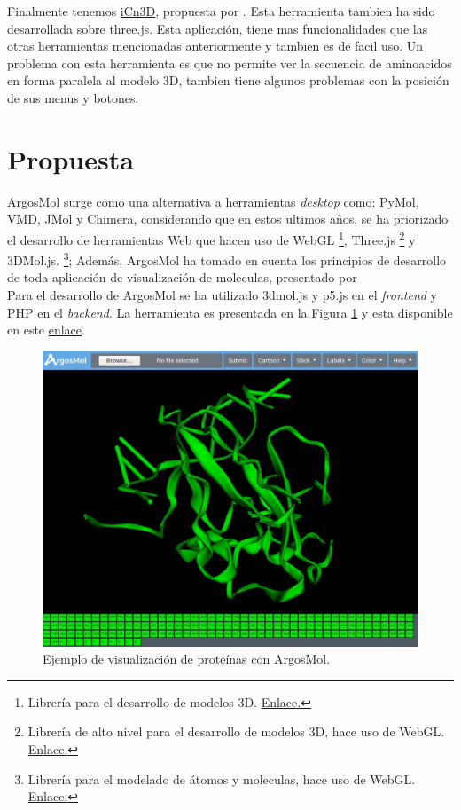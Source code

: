 \documentclass{article}
\begin{document}
Finalmente tenemos \href{https://www.ncbi.nlm.nih.gov/Structure/icn3d/full.html}{iCn3D}, propuesta por  \cite{wang2020icn3d}. Esta herramienta tambien ha sido desarrollada sobre three.js. Esta aplicación, tiene mas funcionalidades que las otras herramientas mencionadas anteriormente y tambien es de facil uso. Un problema con esta herramienta es que no permite ver la secuencia de aminoacidos en forma paralela al modelo 3D, tambien tiene algunos problemas  con la posición de sus menus y botones.


\section{Propuesta}
	
ArgosMol surge como una alternativa a  herramientas \textit{desktop} como: PyMol, VMD, JMol y Chimera, considerando que en estos ultimos años, se ha priorizado el desarrollo de herramientas Web que hacen uso de WebGL \footnote{Librería para el desarrollo de modelos 3D. \href{https://get.webgl.org/}{Enlace.}}, 		
Three.js \footnote{Librería de alto nivel para el desarrollo de modelos 3D, hace uso de WebGL. \href{https://threejs.org/}{Enlace.}} y 		
3DMol.js. \footnote{Librería para el modelado de átomos y moleculas, hace uso de WebGL. \href{https://threejs.org/}{Enlace.}}; Además, ArgosMol ha tomado en cuenta los principios de desarrollo de toda aplicación de visualización de moleculas, presentado por \cite{youkharibache2017twelve} \\

Para el desarrollo de ArgosMol se ha utilizado 3dmol.js y p5.js en el \textit{frontend} y PHP en el \textit{backend}. La herramienta es presentada en la Figura \ref{fig:argos1} y esta disponible en este \href{http://134.209.44.160/argosmol/protein_interaction.php}{enlace}. \\

\begin{figure}[H]
	\centering
	\includegraphics[width=\textwidth]{img/argosmol/mol1}
	\caption{ Ejemplo de visualización de proteínas con ArgosMol. }
	\label{fig:argos1}
\end{figure}
\end{document}
